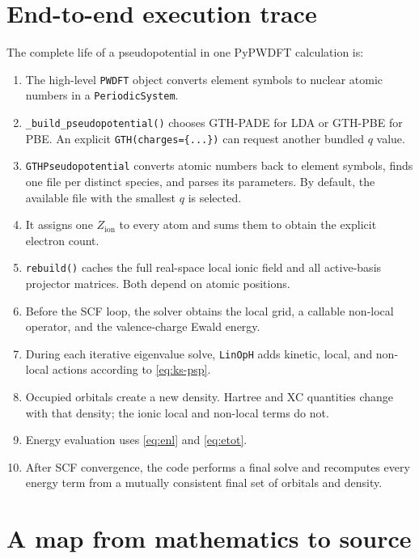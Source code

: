 \documentclass[10pt,twocolumn]{article}
\newcommand{\zion}{Z_{\mathrm{ion}}}
\newcommand{\code}[1]{\texttt{#1}}
\begin{document}
\section{End-to-end execution trace}

The complete life of a pseudopotential in one PyPWDFT calculation is:
\begin{enumerate}
  \item The high-level \code{PWDFT} object converts element symbols to nuclear
  atomic numbers in a \code{PeriodicSystem}.
  \item \code{\_build\_pseudopotential()} chooses GTH-PADE for LDA or GTH-PBE
  for PBE.  An explicit \code{GTH(charges=\{...\})} can request another
  bundled \(q\) value.
  \item \code{GTHPseudopotential} converts atomic numbers back to element
  symbols, finds one file per distinct species, and parses its parameters.
  By default, the available file with the smallest \(q\) is selected.
  \item It assigns one \(\zion\) to every atom and sums them to obtain the
  explicit electron count.
  \item \code{rebuild()} caches the full real-space local ionic field and all
  active-basis projector matrices.  Both depend on atomic positions.
  \item Before the SCF loop, the solver obtains the local grid, a callable
  non-local operator, and the valence-charge Ewald energy.
  \item During each iterative eigenvalue solve, \code{LinOpH} adds kinetic,
  local, and non-local actions according to \cref{eq:ks-psp}.
  \item Occupied orbitals create a new density.  Hartree and XC quantities
  change with that density; the ionic local and non-local terms do not.
  \item Energy evaluation uses \cref{eq:enl} and \cref{eq:etot}.
  \item After SCF convergence, the code performs a final solve and recomputes
  every energy term from a mutually consistent final set of orbitals and
  density.
\end{enumerate}

\section{A map from mathematics to source}
\end{document}
